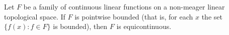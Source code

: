 Let $F$ be a family of continuous linear functions on a non-meager linear topological space. If $F$ is pointwise bounded (that is, for each $x$ the set $\{f(x): f \in F\}$ is bounded), then $F$ is equicontinuous.
